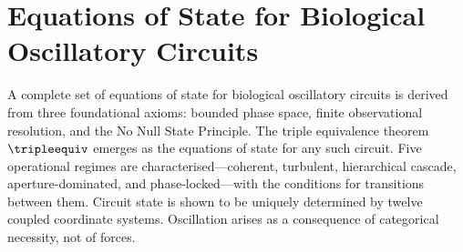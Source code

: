 \chapter{Equations of State for Biological Oscillatory Circuits}
\label{ch:equations_of_state}


\begin{chapterabstract}
A complete set of equations of state for biological oscillatory circuits is derived from three foundational axioms: bounded phase space, finite observational resolution, and the No Null State Principle. The triple equivalence theorem $\tripleequiv$ emerges as the equations of state for any such circuit. Five operational regimes are characterised---coherent, turbulent, hierarchical cascade, aperture-dominated, and phase-locked---with the conditions for transitions between them. Circuit state is shown to be uniquely determined by twelve coupled coordinate systems. Oscillation arises as a consequence of categorical necessity, not of forces.
\end{chapterabstract}


